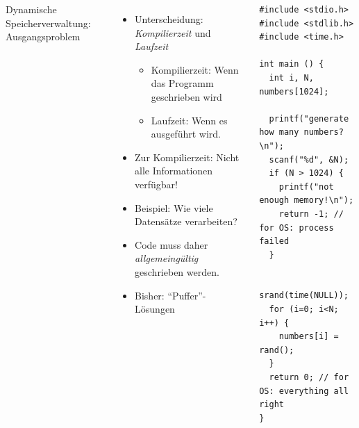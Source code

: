
\begin{frame}[fragile]
%
\begin{columns}[T]
\begin{Large}
Dynamische Speicherverwaltung: Ausgangsproblem
\vspace{10pt}
\end{Large}
%
\begin{itemize}
\item Unterscheidung: \emph{Kompilierzeit} und \emph{Laufzeit}
	\begin{itemize}
	\item Kompilierzeit: Wenn das Programm geschrieben wird
	\item Laufzeit: Wenn es ausgeführt wird.
	\end{itemize}
\item Zur Kompilierzeit: Nicht alle Informationen verfügbar!
\item Beispiel: Wie viele Datensätze verarbeiten?
\item Code muss daher \emph{allgemeingültig} geschrieben werden.
\item Bisher: \enquote{Puffer}-Lösungen
\end{itemize}
%
\begin{codebox}[Beispiel: Liste von Zufallszahlen, height=7.7cm]
\begin{verbatim}
#include <stdio.h>
#include <stdlib.h>
#include <time.h>

int main () {
  int i, N, numbers[1024];
  
  printf("generate how many numbers?\n");
  scanf("%d", &N);
  if (N > 1024) {
    printf("not enough memory!\n");
    return -1; // for OS: process failed
  }
  
  srand(time(NULL));
  for (i=0; i<N; i++) {
    numbers[i] = rand();
  }
  return 0; // for OS: everything all right
}
\end{verbatim}
\end{codebox}
\end{columns}

%
\end{frame}


